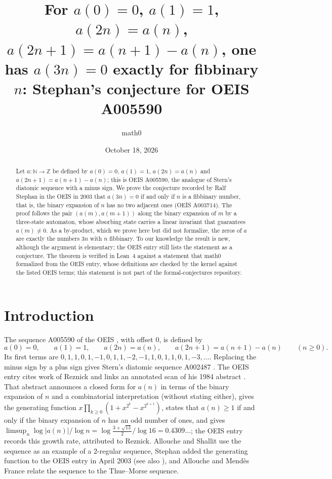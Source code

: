 \documentclass[11pt]{amsart}
\title[Zeros of OEIS A005590 at multiples of three]{For $a(0)=0$, $a(1)=1$, $a(2n)=a(n)$, $a(2n+1)=a(n+1)-a(n)$, one has $a(3n)=0$ exactly for fibbinary $n$: Stephan's conjecture for OEIS A005590}
\author{math0}
\date{October 18, 2026}
\theoremstyle{plain}
\theoremstyle{definition}
\newcommand{\N}{\mathbb{N}}
\newcommand{\Z}{\mathbb{Z}}
\begin{document}
\begin{abstract}
Let $a\colon\N\to\Z$ be defined by $a(0)=0$, $a(1)=1$, $a(2n)=a(n)$ and $a(2n+1)=a(n+1)-a(n)$; this is OEIS A005590, the analogue of Stern's diatomic sequence with a minus sign.
We prove the conjecture recorded by Ralf Stephan in the OEIS in 2003 that $a(3n)=0$ if and only if $n$ is a fibbinary number, that is, the binary expansion of $n$ has no two adjacent ones (OEIS A003714).
The proof follows the pair $(a(m),a(m+1))$ along the binary expansion of $m$ by a three-state automaton, whose absorbing state carries a linear invariant that guarantees $a(m)\ne0$. As a by-product, which we prove here but did not formalize, the zeros of $a$ are exactly the numbers $3n$ with $n$ fibbinary.
To our knowledge the result is new, although the argument is elementary; the OEIS entry still lists the statement as a conjecture.
The theorem is verified in Lean~4 against a statement that math0 formalized from the OEIS entry, whose definitions are checked by the kernel against the listed OEIS terms; this statement is not part of the formal-conjectures repository.
\end{abstract}
\maketitle

\section{Introduction}

The sequence A005590 of the OEIS \cite{A005590}, with offset $0$, is defined by
\[
  a(0)=0,\qquad a(1)=1,\qquad a(2n)=a(n),\qquad a(2n+1)=a(n+1)-a(n)\qquad(n\ge0).
\]
Its first terms are $0,1,1,0,1,-1,0,1,1,-2,-1,1,0,1,1,0,1,-3,\dots$.
Replacing the minus sign by a plus sign gives Stern's diatomic sequence A002487 \cite{A002487}.
The OEIS entry cites work of Reznick \cite{Rez84,Rez85} and links an annotated scan of his 1984 abstract \cite{Rez84}.
That abstract announces a closed form for $a(n)$ in terms of the binary expansion of $n$ and a combinatorial interpretation (without stating either), gives the generating function $x\prod_{k\ge0}(1+x^{2^k}-x^{2^{k+1}})$, states that $a(n)\ge1$ if and only if the binary expansion of $n$ has an odd number of ones, and gives $\limsup_n \log|a(n)|/\log n=\log\frac{3+\sqrt{13}}{2}\big/\log 16=0.4309\ldots$; the OEIS entry records this growth rate, attributed to Reznick.
Allouche and Shallit \cite[Example~7]{AS} use the sequence as an example of a $2$-regular sequence, Stephan added the generating function to the OEIS entry in April 2003 (see also \cite{St03}), and Allouche and Mend\`es France \cite{AMF} relate the sequence to the Thue--Morse sequence.
\end{document}
